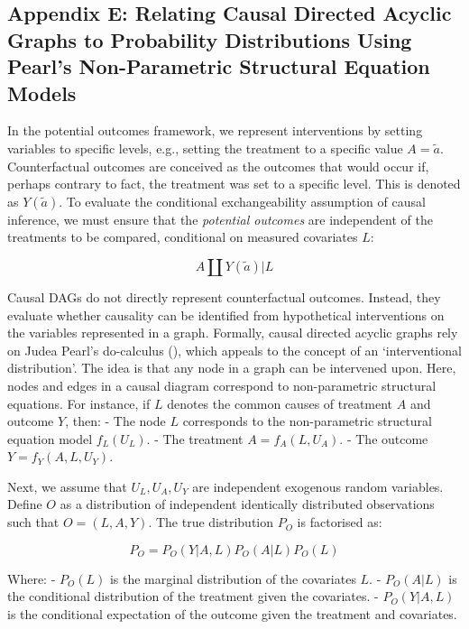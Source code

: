 \documentclass[
  single column]{article}
\begin{document}
\newpage{}

\subsection{Appendix E: Relating Causal Directed Acyclic Graphs to
Probability Distributions Using Pearl's Non-Parametric Structural
Equation Models}\label{id-app-E}

In the potential outcomes framework, we represent interventions by
setting variables to specific levels, e.g., setting the treatment to a
specific value \(A = \tilde{a}\). Counterfactual outcomes are conceived
as the outcomes that would occur if, perhaps contrary to fact, the
treatment was set to a specific level. This is denoted as
\(Y(\tilde{a})\). To evaluate the conditional exchangeability assumption
of causal inference, we must ensure that the \emph{potential outcomes}
are independent of the treatments to be compared, conditional on
measured covariates \(L\):

\[
A \coprod Y(\tilde{a})|L
\]

Causal DAGs do not directly represent counterfactual outcomes. Instead,
they evaluate whether causality can be identified from hypothetical
interventions on the variables represented in a graph. Formally, causal
directed acyclic graphs rely on Judea Pearl's do-calculus
(), which appeals to the concept of
an `interventional distribution'. The idea is that any node in a graph
can be intervened upon. Here, nodes and edges in a causal diagram
correspond to non-parametric structural equations. For instance, if
\(L\) denotes the common causes of treatment \(A\) and outcome \(Y\),
then: - The node \(L\) corresponds to the non-parametric structural
equation model \(f_L(U_L)\). - The treatment \(A = f_A(L, U_A)\). - The
outcome \(Y = f_Y(A, L, U_Y)\).

Next, we assume that \(U_L, U_A, U_Y\) are independent exogenous random
variables. Define \(O\) as a distribution of independent identically
distributed observations such that \(O = (L, A, Y)\). The true
distribution \(P_O\) is factorised as:

\[
P_O = P_O(Y|A, L) P_O(A|L) P_O(L)
\]

Where: - \(P_O(L)\) is the marginal distribution of the covariates
\(L\). - \(P_O(A|L)\) is the conditional distribution of the treatment
given the covariates. - \(P_O(Y|A, L)\) is the conditional expectation
of the outcome given the treatment and covariates.
\end{document}
